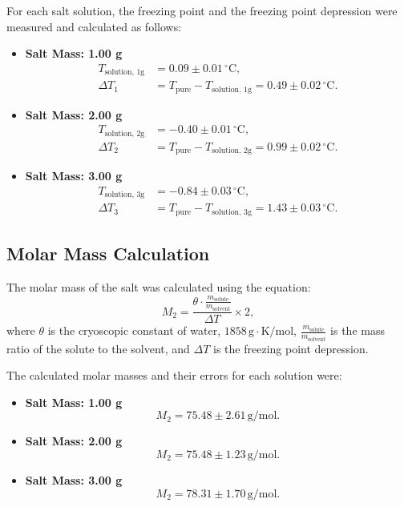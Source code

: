 \documentclass[a4paper,12pt]{article}
\begin{document}
For each salt solution, the freezing point and the freezing point depression were measured and calculated as follows:

\begin{itemize}
    \item \textbf{Salt Mass: 1.00 g}
    \begin{align*}
    T_{\text{solution, 1g}} &= 0.09 \pm 0.01 \, ^\circ\text{C}, \\
    \Delta T_1 &= T_{\text{pure}} - T_{\text{solution, 1g}} = 0.49 \pm 0.02 \, ^\circ\text{C}.
    \end{align*}

    \item \textbf{Salt Mass: 2.00 g}
    \begin{align*}
    T_{\text{solution, 2g}} &= -0.40 \pm 0.01 \, ^\circ\text{C}, \\
    \Delta T_2 &= T_{\text{pure}} - T_{\text{solution, 2g}} = 0.99 \pm 0.02 \, ^\circ\text{C}.
    \end{align*}

    \item \textbf{Salt Mass: 3.00 g}
    \begin{align*}
    T_{\text{solution, 3g}} &= -0.84 \pm 0.03 \, ^\circ\text{C}, \\
    \Delta T_3 &= T_{\text{pure}} - T_{\text{solution, 3g}} = 1.43 \pm 0.03 \, ^\circ\text{C}.
    \end{align*}
\end{itemize}

\subsection{Molar Mass Calculation}
The molar mass of the salt was calculated using the equation:
\begin{equation}
M_2 = \frac{\theta \cdot \frac{m_{\text{solute}}}{m_{\text{solvent}}}}{\Delta T} \times 2,
\end{equation}
where $\theta$ is the cryoscopic constant of water, $1858 \, \text{g} \cdot \text{K/mol}$, $\frac{m_{\text{solute}}}{m_{\text{solvent}}}$ is the mass ratio of the solute to the solvent, and $\Delta T$ is the freezing point depression. 

The calculated molar masses and their errors for each solution were:

\begin{itemize}
    \item \textbf{Salt Mass: 1.00 g}
    \begin{equation*}
    M_2 = 75.48 \pm 2.61 \, \text{g/mol}.
    \end{equation*}

    \item \textbf{Salt Mass: 2.00 g}
    \begin{equation*}
    M_2 = 75.48 \pm 1.23 \, \text{g/mol}.
    \end{equation*}

    \item \textbf{Salt Mass: 3.00 g}
    \begin{equation*}
    M_2 = 78.31 \pm 1.70 \, \text{g/mol}.
    \end{equation*}
\end{itemize}
\end{document}
